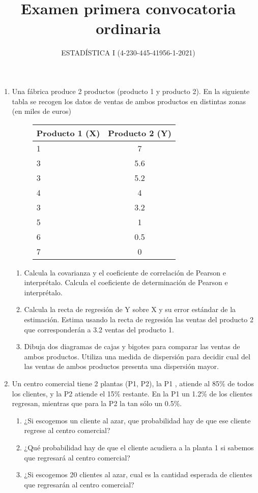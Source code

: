 \documentclass[]{article}
\title{Examen primera convocatoria ordinaria}
\author{ESTADÍSTICA I (4-230-445-41956-1-2021)}
\date{}
\theoremstyle{plain}
\theoremstyle{definition}
\theoremstyle{definition} %
\begin{document}
\maketitle

\begin{enumerate}
  \item 
 
    Una fábrica produce 2 productos (producto 1 y producto 2). En la siguiente tabla se recogen los datos de ventas de ambos productos 
    en distintas zonas (en miles de euros)
    \begin{figure}
      \centering
      \begin{tabular}{lc}
        Producto 1 (X) & Producto 2 (Y)\\
        \hline
        1 & 7    \\
        3 & 5.6  \\  
        3 & 5.2     \\
        4 & 4  \\ 
        3 & 3.2    \\
        5 & 1  \\  
        6 & 0.5\\    
        7 & 0    
      \end{tabular}
    \end{figure}

    \begin{enumerate}
      \item
      Calcula la covarianza y el coeficiente de correlación de Pearson e
      interprétalo. Calcula el coeficiente de determinación de Pearson e interprétalo.
      
      \item
      Calcula la recta de regresión de Y sobre X y su error estándar de la estimación. 
      Estima usando la recta de regresión las ventas del producto 2 que corresponderán a 3.2 ventas del producto 1.

      \item Dibuja dos diagramas de cajas y bigotes para comparar las ventas de ambos productos. Utiliza una medida de dispersión para decidir
      cual del las ventas de ambos productos presenta una dispersión mayor.
    \end{enumerate}
 
  \item Un centro comercial tiene 2 plantas (P1, P2), la P1 , atiende
    al 85\% de todos los clientes, y la P2 atiende el 
    15\% restante. En la P1 un 1.2\% de los clientes regresan, mientras que para la P2 la tan sólo un 0.5\%.
    \begin{enumerate}
      \item ¿Si escogemos un cliente al azar, que probabilidad hay de que ese cliente regrese al centro comercial?
      \item ¿Qué probabilidad hay de que el cliente acudiera a la planta 1 si sabemos que regresará al centro comercial?
      \item ¿Si escogemos 20 clientes al azar, cual es la cantidad esperada de clientes que regresarán al centro comercial?
    \end{enumerate}
 


\end{enumerate}
\end{document}
